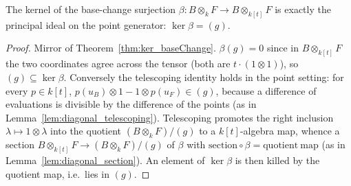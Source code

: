 \begin{theorem}
  \label{thm:ker_pointBaseChange}
  \leanok
  The kernel of the base-change surjection
  \(\beta \colon B \otimes_k F \to B \otimes_{k[t]} F\) is exactly the principal ideal on
  the point generator: \(\ker \beta = (g)\).
\end{theorem}
\begin{proof}
  \leanok
  Mirror of Theorem~\ref{thm:ker_baseChange}. \(\beta(g) = 0\) since in
  \(B \otimes_{k[t]} F\) the two coordinates agree across the tensor (both are
  \(t \cdot (1 \otimes 1)\)), so \((g) \subseteq \ker\beta\). Conversely the telescoping
  identity holds in the point setting: for every \(p \in k[t]\),
  \(p(u_B) \otimes 1 - 1 \otimes p(u_F) \in (g)\), because a difference of evaluations is
  divisible by the difference of the points (as in Lemma~\ref{lem:diagonal_telescoping}).
  Telescoping promotes the right inclusion \(\lambda \mapsto 1 \otimes \lambda\) into the
  quotient \((B \otimes_k F)/(g)\) to a \(k[t]\)-algebra map, whence a section
  \(B \otimes_{k[t]} F \to (B \otimes_k F)/(g)\) of \(\beta\) with
  \(\mathrm{section} \circ \beta = \mathrm{quotient\ map}\) (as in
  Lemma~\ref{lem:diagonal_section}). An element of \(\ker\beta\) is then killed by the
  quotient map, i.e.\ lies in \((g)\).
\end{proof}

